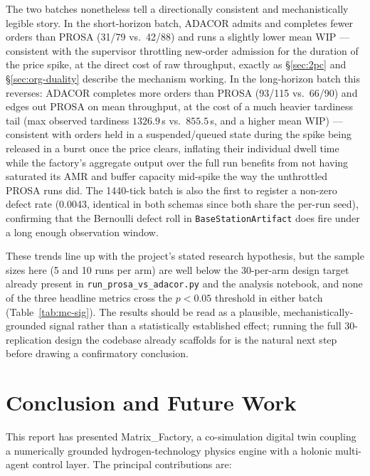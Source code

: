 \documentclass[twocolumn,10pt,a4paper]{article}
\newcommand{\code}[1]{\texttt{\small #1}}
\newcommand{\file}[1]{\texttt{#1}}
\begin{document}
The two batches nonetheless tell a directionally consistent and mechanistically legible story. In the short-horizon batch, ADACOR admits and completes fewer orders than PROSA (31/79 vs.\ 42/88) and runs a slightly lower mean WIP --- consistent with the supervisor throttling new-order admission for the duration of the price spike, at the direct cost of raw throughput, exactly as \S\ref{sec:2pc} and \S\ref{sec:org-duality} describe the mechanism working. In the long-horizon batch this reverses: ADACOR completes more orders than PROSA (93/115 vs.\ 66/90) and edges out PROSA on mean throughput, at the cost of a much heavier tardiness tail (max observed tardiness $1326.9$\,s vs.\ $855.5$\,s, and a higher mean WIP) --- consistent with orders held in a suspended/queued state during the spike being released in a burst once the price clears, inflating their individual dwell time while the factory's aggregate output over the full run benefits from not having saturated its AMR and buffer capacity mid-spike the way the unthrottled PROSA runs did. The 1440-tick batch is also the first to register a non-zero defect rate (0.0043, identical in both schemas since both share the per-run seed), confirming that the Bernoulli defect roll in \code{BaseStationArtifact} does fire under a long enough observation window.

These trends line up with the project's stated research hypothesis, but the sample sizes here (5 and 10 runs per arm) are well below the 30-per-arm design target already present in \file{run\_prosa\_vs\_adacor.py} and the analysis notebook, and none of the three headline metrics cross the $p<0.05$ threshold in either batch (Table~\ref{tab:mc-sig}). The results should be read as a plausible, mechanistically-grounded signal rather than a statistically established effect; running the full 30-replication design the codebase already scaffolds for is the natural next step before drawing a confirmatory conclusion.

\section{Conclusion and Future Work}
\label{ch:conclusion}

This report has presented Matrix\_Factory, a co-simulation digital twin coupling a numerically grounded hydrogen-technology physics engine with a holonic multi-agent control layer. The principal contributions are:
\end{document}
